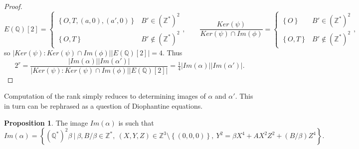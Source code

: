 \documentclass{article}
\newcommand{\Z}{\mathbb{Z}}
\newcommand{\Q}{\mathbb{Q}}
\newcommand{\rb}[1]{\left( #1 \right)}
\renewcommand{\sb}[1]{\left[ #1 \right]}
\newcommand{\cb}[1]{\left\{ #1 \right\}}
\newcommand{\abs}[1]{\left\lvert #1 \right\rvert}
\theoremstyle{definition}\newtheorem*{definition}{Definition}
\theoremstyle{definition}\newtheorem*{example}{Example}
\theoremstyle{definition}\newtheorem*{remark}{Remark}
\newtheorem{proposition}{Proposition}[subsection]
\begin{document}
\begin{proof}
$$ E\rb{\Q}\sb{2} = \begin{cases} \cb{O, T, \rb{a, 0}, \rb{a', 0}} & B' \in \rb{\Z^*}^2 \\ \cb{O, T} & B' \notin \rb{\Z^*}^2 \end{cases}, \qquad \dfrac{Ker\rb{\psi}}{Ker\rb{\psi} \cap Im\rb{\phi}} = \begin{cases} \cb{O} & B' \in \rb{\Z^*}^2 \\ \cb{O, T} & B' \notin \rb{\Z^*}^2 \end{cases}, $$
so $ \abs{Ker\rb{\psi} : Ker\rb{\psi} \cap Im\rb{\phi}}\abs{E\rb{\Q}\sb{2}} = 4 $. Thus
$$ 2^r = \dfrac{\abs{Im\rb{\alpha}}\abs{Im\rb{\alpha'}}}{\abs{Ker\rb{\psi} : Ker\rb{\psi} \cap Im\rb{\phi}}\abs{E\rb{\Q}\sb{2}}} = \tfrac{1}{4}\abs{Im\rb{\alpha}}\abs{Im\rb{\alpha'}}. $$
\end{proof}

Computation of the rank simply reduces to determining images of $ \alpha $ and $ \alpha' $. This in turn can be rephrased as a question of Diophantine equations.

\begin{proposition}
The image $ Im\rb{\alpha} $ is such that
$$ Im\rb{\alpha} = \cb{\rb{\Q^*}^2\beta \ \Big| \ \beta, B / \beta \in \Z^*, \ \rb{X, Y, Z} \in \Z^3 \setminus \cb{\rb{0, 0, 0}}, \ Y^2 = \beta X^4 + AX^2Z^2 + \rb{B / \beta}Z^4}. $$
\end{proposition}
\end{document}
